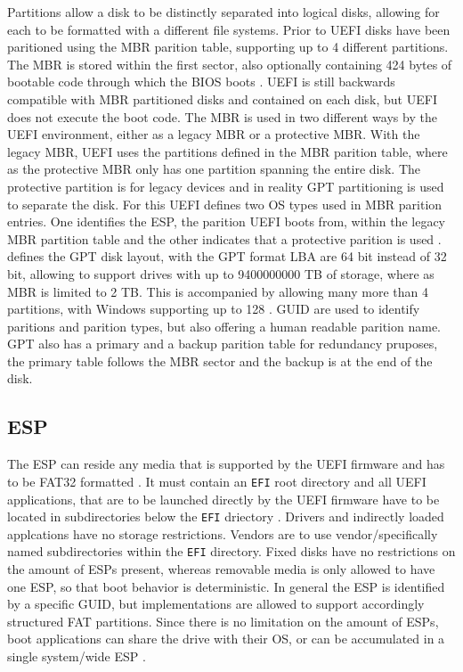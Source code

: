 Partitions allow a disk to be distinctly separated into logical disks, allowing for each to be formatted with a different file systems.
Prior to \ac{UEFI} disks have been paritioned using the \ac{MBR} parition table, supporting up to 4 different partitions.
The \ac{MBR} is stored within the first sector, also optionally containing 424 bytes of bootable code through which the \ac{BIOS} boots \cite[Section 13.3.1]{uefi-spec}.
\ac{UEFI} is still backwards compatible with \ac{MBR} partitioned disks and contained on each disk, but \ac{UEFI} does not execute the boot code.
The \ac{MBR} is used in two different ways by the \ac{UEFI} environment, either as a legacy \ac{MBR} or a protective \ac{MBR}.
With the legacy \ac{MBR}, \ac{UEFI} uses the partitions defined in the \ac{MBR} parition table, where as the protective \ac{MBR} only has one partition spanning the entire disk.
The protective partition is for legacy devices and in reality \ac{GPT} partitioning is used to separate the disk.
For this \ac{UEFI} defines two \ac{OS} types used in \ac{MBR} parition entries.
One identifies the \ac{ESP}, the parition \ac{UEFI} boots from, within the legacy \ac{MBR} partition table and the other indicates that a protective parition is used \cite[Section 5]{uefi-spec}.
\cite[Section 5]{uefi-spec} defines the \ac{GPT} disk layout, with the \ac{GPT} format \ac{LBA} are 64 bit instead of 32 bit, allowing to support drives with up to 9400000000 \ac{TB} of storage, where as \ac{MBR} is limited to 2 \ac{TB}.
This is accompanied by allowing many more than 4 partitions, with Windows supporting up to 128 \cite{microsoft-windows-and-gpt-faq}.
\ac{GUID} are used to identify paritions and parition types, but also offering a human readable parition name.
\ac{GPT} also has a primary and a backup parition table for redundancy pruposes, the primary table follows the \ac{MBR} sector and the backup is at the end of the disk.

\subsection{\acf{ESP}}

The \ac{ESP} can reside any media that is supported by the \ac{UEFI} firmware and has to be \ac{FAT}32 formatted \cite[Section 13.3]{uefi-spec}.
It must contain an \lstinline{EFI} root directory \cite[Section 13.3.1.3]{uefi-spec} and all \ac{UEFI} applications, that are to be launched directly by the \ac{UEFI} firmware have to be located in subdirectories below the \lstinline{EFI} driectory \cite[Section 13.3.1.3]{uefi-spec}. Drivers and indirectly loaded applcations have no storage restrictions. Vendors are to use vendor\-/specifically named subdirectories within the \lstinline{EFI} directory. Fixed disks have no restrictions on the amount of \acp{ESP} present, whereas removable media is only allowed to have one \ac{ESP}, so that boot behavior is deterministic. In general the \ac{ESP} is identified by a specific \ac{GUID}, but implementations are allowed to support accordingly structured \ac{FAT} partitions. Since there is no limitation on the amount of \acp{ESP}, boot applications can share the drive with their \ac{OS}, or can be accumulated in a single system\-/wide \ac{ESP} \cite[Section 13.3.3]{uefi-spec}.


